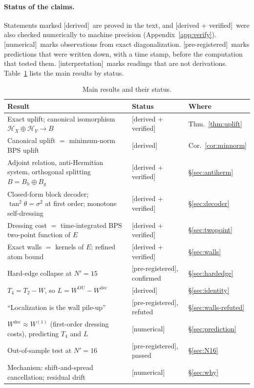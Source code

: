 \documentclass[11pt]{article}
\newcommand{\Np}{N'}
\newcommand{\Hc}{\mathcal H}
\newcommand{\dec}{\mathrm{dec}}
\newcommand{\OU}{\mathrm{OU}}
\newcommand{\Wone}{W^{(1)}}
\newcommand{\tagbox}[2]{\textsf{\small\color{#1}[#2]}}
\newcommand{\DER}{\tagbox{cder}{derived}}
\newcommand{\VER}{\tagbox{cder}{derived + verified}}
\newcommand{\NUM}{\tagbox{cnum}{numerical}}
\newcommand{\PRE}{\tagbox{cnum}{pre-registered}}
\newcommand{\INTERP}{\tagbox{cconj}{interpretation}}
\theoremstyle{plain}
\theoremstyle{remark}
\numberwithin{equation}{section}
\begin{document}
\paragraph{Status of the claims.} Statements marked \DER\ are proved in the text, and \VER\ were also checked numerically
to machine precision (Appendix~\ref{app:verify}). \NUM\ marks observations from exact diagonalization. \PRE\ marks
predictions that were written down, with a time stamp, before the computation that tested them. \INTERP\ marks
readings that are not derivations. Table~\ref{tab:status} lists the main results by status.

\begin{table}[ht]
\centering\small
\caption{Main results and their status.}\label{tab:status}
\begin{tabular}{@{}>{\raggedright\arraybackslash}p{}>{\raggedright\arraybackslash}p{}l@{}}\toprule
Result & Status & Where\\\midrule
Exact uplift; canonical isomorphism $\Hc_X\oplus\Hc_Y\to B$ & \VER & Thm.~\ref{thm:uplift}\\
Canonical uplift $=$ minimum-norm BPS uplift & \DER & Cor.~\ref{cor:minnorm}\\
Adjoint relation, anti-Hermitian system, orthogonal splitting $B=B_h\oplus B_g$ & \VER & \S\ref{sec:antiherm}\\
Closed-form block decoder; $\tan^2\theta=\sigma^2$ at first order; monotone self-dressing & \VER & \S\ref{sec:decoder}\\
Dressing cost $=$ time-integrated BPS two-point function of $E$ & \VER & \S\ref{sec:twopoint}\\
Exact walls $=$ kernels of $E$; refined atom bound & \VER & \S\ref{sec:walls}\\
Hard-edge collapse at $\Np=15$ & \PRE, confirmed & \S\ref{sec:hardedge}\\
$T_4=T_2-W$, so $L=W^\OU-W^\dec$ & \DER & \S\ref{sec:identity}\\
``Localization is the wall pile-up'' & \PRE, refuted & \S\ref{sec:walls-refuted}\\
$W^\dec\approx\Wone$ (first-order dressing costs), predicting $T_4$ and $L$ & \NUM & \S\ref{sec:prediction}\\
Out-of-sample test at $\Np=16$ & \PRE, passed & \S\ref{sec:N16}\\
Mechanism: shift-and-spread cancellation; residual drift & \NUM & \S\ref{sec:why}\\\bottomrule
\end{tabular}
\end{table}
\end{document}
